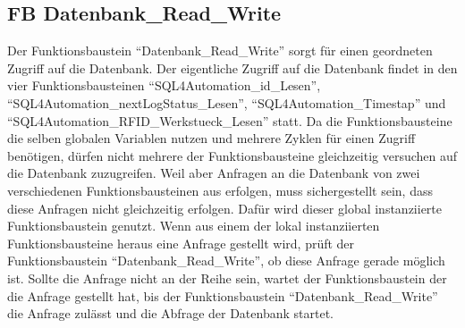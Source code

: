 \subsection{FB Datenbank\_Read\_Write}\label{kap:FB_Datenbank_Read_Write}
Der Funktionsbaustein "`Datenbank\_Read\_Write"' sorgt für einen geordneten Zugriff auf die Datenbank. Der eigentliche Zugriff auf die Datenbank findet in den vier Funktionsbausteinen "`SQL4Automation\_id\_Lesen"', "`SQL4Auto\-mation\-\_\-next\-Log\-Sta\-tus\-\_Lesen"', "`SQL\-4Auto\-mat\-ion\_Ti\-me\-stap"' und "`SQL4Auto\-mation\-\_\-RFID\-\_Werkstueck\_Lesen"' statt. Da die Funktionsbausteine die selben globalen Variablen nutzen und mehrere Zyklen für einen Zugriff benötigen, dürfen nicht mehrere der Funktionsbausteine gleichzeitig versuchen auf die Datenbank zuzugreifen. Weil aber Anfragen an die Datenbank von zwei verschiedenen Funktionsbausteinen aus erfolgen, muss sichergestellt sein, dass diese Anfragen nicht gleichzeitig erfolgen. Dafür wird dieser global instanziierte Funktionsbaustein genutzt. Wenn aus einem der lokal instanziierten Funktionsbausteine heraus eine Anfrage gestellt wird, prüft der Funktionsbaustein "`Datenbank\_Read\_Write"', ob diese Anfrage gerade möglich ist. Sollte die Anfrage nicht an der Reihe sein, wartet der Funktionsbaustein der die Anfrage gestellt hat, bis der Funktionsbaustein "`Datenbank\_Read\_Write"' die Anfrage zulässt und die Abfrage der Datenbank startet. 

